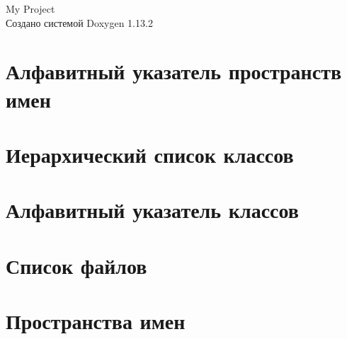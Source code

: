 \documentclass[twoside]{book}
\newcommand{\+}{\discretionary{\mbox{\scriptsize$\hookleftarrow$}}{}{}}
\newcommand{\clearemptydoublepage}{%
    \newpage{\pagestyle{empty}\cleardoublepage}%
  }
\begin{document}
  \raggedbottom
  \begin{titlepage}
  \vspace*{7cm}
  \begin{center}%
  {\Large My Project}\\
  \vspace*{1cm}
  {\large Создано системой Doxygen 1.13.2}\\
  \end{center}
  \end{titlepage}
  \clearemptydoublepage
  \tableofcontents
  \clearemptydoublepage
\chapter{Алфавитный указатель пространств имен}

\chapter{Иерархический список классов}

\chapter{Алфавитный указатель классов}

\chapter{Список файлов}

\chapter{Пространства имен}

\end{document}
